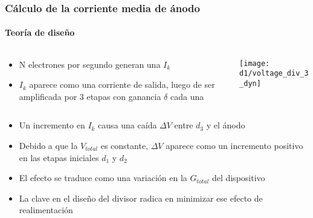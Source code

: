 \documentclass{beamer}
\begin{document}
\begin{frame}
\frametitle{C\'alculo de la corriente media de \'anodo}
\framesubtitle{Teor\'ia de diseño}
\begin{columns}
\begin{column}{0.5\textwidth}
\begin{itemize}
\item N electrones por segundo generan una $I_k$ 
\item $I_k$ aparece como una corriente de salida, luego de ser amplificada por 3
etapas con ganancia $\delta$ cada una
\end{itemize}
\end{column}
\begin{column}{0.5\textwidth}
\begin{center}
\texttt{[image: d1/voltage\_div\_3\_dyn]}
\end{center}
\end{column}
\end{columns}
\begin{itemize}
\item Un incremento en $I_k$ causa una ca\'ida $\Delta V$ entre $d_3$ y el \'anodo
\item Debido a que la $V_{total}$ es constante, $\Delta V$ aparece como un
incremento positivo en las etapas iniciales $d_1$ y $d_2$
\item El efecto se traduce como una variaci\'on en la $G_{total}$ del dispositivo
\item \alert{La clave en el diseño del divisor radica en minimizar ese efecto de
realimentaci\'on}
\end{itemize}
\end{frame} 
\end{document}
